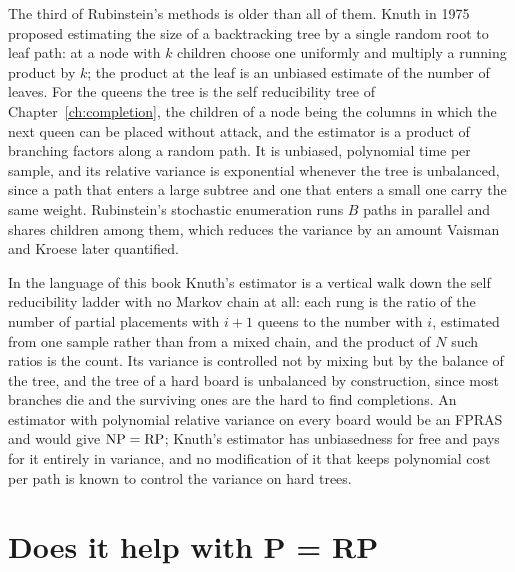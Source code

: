 The third of Rubinstein's methods is older than all of them. Knuth in 1975 \cite{Knuth1975} proposed estimating the size of a backtracking tree by a single random root to leaf path: at a node with $k$ children choose one uniformly and multiply a running product by $k$; the product at the leaf is an unbiased estimate of the number of leaves. For the queens the tree is the self reducibility tree of Chapter~\ref{ch:completion}, the children of a node being the columns in which the next queen can be placed without attack, and the estimator is a product of branching factors along a random path. It is unbiased, polynomial time per sample, and its relative variance is exponential whenever the tree is unbalanced, since a path that enters a large subtree and one that enters a small one carry the same weight. Rubinstein's stochastic enumeration runs $B$ paths in parallel and shares children among them, which reduces the variance by an amount Vaisman and Kroese \cite{VaismanKroese} later quantified.

In the language of this book Knuth's estimator is a vertical walk down the self reducibility ladder with no Markov chain at all: each rung is the ratio of the number of partial placements with $i + 1$ queens to the number with $i$, estimated from one sample rather than from a mixed chain, and the product of $N$ such ratios is the count. Its variance is controlled not by mixing but by the balance of the tree, and the tree of a hard board is unbalanced by construction, since most branches die and the surviving ones are the hard to find completions. An estimator with polynomial relative variance on every board would be an FPRAS and would give $\mathrm{NP} = \mathrm{RP}$; Knuth's estimator has unbiasedness for free and pays for it entirely in variance, and no modification of it that keeps polynomial cost per path is known to control the variance on hard trees.

\section{Does it help with P = RP}

